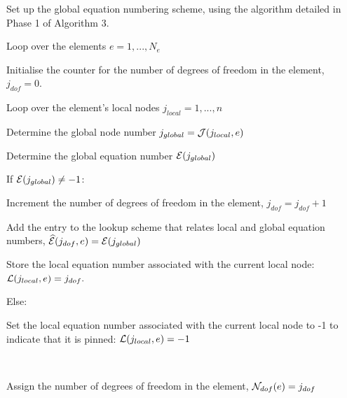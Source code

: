 \begin{DoxyItemize}
\item Set up the global equation numbering scheme, using the algorithm detailed in Phase 1 of Algorithm 3.
\item Loop over the elements $ e=1,...,N_e $
\begin{DoxyItemize}
\item Initialise the counter for the number of degrees of freedom in the element, $ j_{dof}=0 $.
\item Loop over the element's local nodes $ j_{local}=1,...,n$
\begin{DoxyItemize}
\item Determine the global node number $ j_{global} = {\cal J}(j_{local},e) $
\item Determine the global equation number ${\cal E}(j_{global})$
\item If ${\cal E}(j_{global}) \ne -1$\-:
\begin{DoxyItemize}
\item Increment the number of degrees of freedom in the element, $ j_{dof}=j_{dof}+1$
\item Add the entry to the lookup scheme that relates local and global equation numbers, $ \widehat{\cal E}(j_{dof},e) = {\cal E}(j_{global})$
\item \begin{TabularC}{1}
\hline
Store the local equation number associated with the current local node\-: $ {\cal L}(j_{local},e)=j_{dof}.$   \\
\end{TabularC}

\end{DoxyItemize}
\item Else\-: \begin{TabularC}{1}
\hline

\begin{DoxyItemize}
\item Set the local equation number associated with the current local node to -\/1 to indicate that it is pinned\-: $ {\cal L}(j_{local},e)=-1$   
\end{DoxyItemize}\\
\end{TabularC}

\end{DoxyItemize}
\item Assign the number of degrees of freedom in the element, $ {\cal N}_{dof}(e)=j_{dof} $
\end{DoxyItemize}
\end{DoxyItemize}

